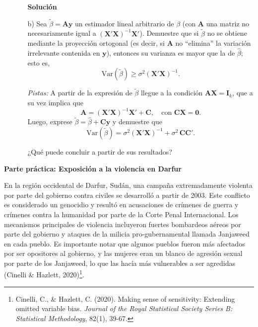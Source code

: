 \documentclass[a4paper, answers, addpoints, 11pt]{exam}
\newenvironment{solucion}{%
  \begin{mdframed}[
    backgroundcolor=blue!5,    %
    linecolor=blue!50,          %
    linewidth=2pt,              %
    leftmargin=10pt,            %
    rightmargin=10pt,           %
    topline=true,              %
    bottomline=true,            %
    roundcorner=10pt,           %
    innerleftmargin=10pt,       %
    innerrightmargin=10pt,      %
    innerbottommargin=10pt,     %
    innertopmargin=10pt         %
  ]%
  \begin{tcolorbox}[colframe=blue!50!black, colback=blue!50, coltitle=white, sharp corners=all, boxrule=1mm, width=\textwidth, halign=left, valign=center, top=0mm, bottom=0mm, left=0mm, right=0mm] \textbf{Solución} \end{tcolorbox} }{\end{mdframed}}
\begin{document}
\begin{enumerate}
\begin{itemize}
\begin{solucion}
 \end{solucion}


    \item[b)] Sea \(\tilde{\beta} = \mathbf{A}\mathbf{y}\) un estimador lineal arbitrario de \(\beta\) (con \(\mathbf{A}\) una matriz no necesariamente igual a \((\mathbf{X}'\mathbf{X})^{-1}\mathbf{X}'\)). Demuestre que si \(\tilde{\beta}\) no se obtiene mediante la proyección ortogonal (es decir, si \(\mathbf{A}\) no ``elimina'' la variación irrelevante contenida en \(\mathbf{y}\)), entonces su varianza es mayor que la de \(\hat{\beta}\); esto es,
\[
\mathrm{Var}(\tilde{\beta}) \geq \sigma^2 (\mathbf{X}'\mathbf{X})^{-1}.
\]

\textit{Pistas:} A partir de la expresión de $\tilde{\beta}$ llegue a la condición \(\mathbf{A}\mathbf{X} = \mathbf{I}_k\), que a su vez implica que
\[
\mathbf{A} = (\mathbf{X}'\mathbf{X})^{-1}\mathbf{X}' + \mathbf{C}, \quad \text{con } \mathbf{C}\mathbf{X} = \mathbf{0}.
\]
Luego, exprese \(\tilde{\beta} = \hat{\beta} + \mathbf{C}\mathbf{y}\) y demuestre que
\[
\mathrm{Var}(\tilde{\beta}) = \sigma^2 (\mathbf{X}'\mathbf{X})^{-1} + \sigma^2\,\mathbf{C}\mathbf{C}'.
\] 

¿Qué puede concluir a partir de sus resultados?

\end{itemize}
    \end{enumerate}

    \bigskip


\Large\textbf{Parte práctica: Exposición a la violencia en Darfur}

\normalsize\bigskip En la región occidental de Darfur, Sudán, una campaña extremadamente violenta por parte del gobierno contra civiles se desarrolló a partir de 2003. Este conflicto es considerado un genocidio y resultó en acusaciones de crímenes de guerra y crímenes contra la humanidad por parte de la Corte Penal Internacional. Los mecanismos principales de violencia incluyeron fuertes bombardeos aéreos por parte del gobierno y ataques de la milicia pro-gubernamental llamada Janjaweed en cada pueblo. Es importante notar que algunos pueblos fueron más afectados por ser opositores al gobierno, y las mujeres eran un blanco de agresión sexual por parte de los Janjaweed, lo que las hacía más vulnerables a ser agredidas (Cinelli \& Hazlett, 2020)\footnote{Cinelli, C., \& Hazlett, C. (2020). Making sense of sensitivity: Extending omitted variable bias. \textit{Journal of the Royal Statistical Society Series B: Statistical Methodology}, 82(1), 39-67.
}.
\end{document}
